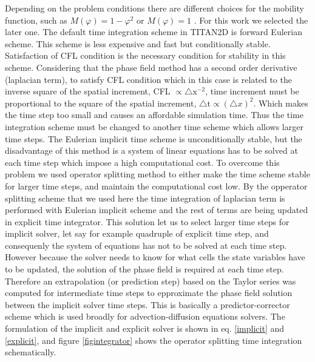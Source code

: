 \documentclass[letterpaper,10pt]{article}
\begin{document}
Depending on the problem conditions there are different choices for the mobility function, such 
as $M(\varphi)=1-\varphi^2$ or $M(\varphi)=1$ \cite{}. For this work we selected the later one.\newline
The default time integration scheme in TITAN2D is forward Eulerian scheme. This scheme is less expensive and fast but conditionally 
stable. Satisfaction of CFL condition is the necessary condition for stability in this scheme. Considering that the phase field 
method has a second order derivative (laplacian term), to satisfy CFL condition which in this case is related to the inverse
square of the spatial increment, CFL $\propto \bigtriangleup \text{x}^{-2}$, time increment must be proportional to the square 
of the spatial increment, $\bigtriangleup \text{t} \propto ( \bigtriangleup x)^2 $. Which makes the time step too small and causes 
an affordable simulation time.
Thus the time integration scheme must be changed to another time scheme which allows larger time steps.
The Eulerian implicit time scheme is unconditionally stable, but the disadvantage of this method is 
a system of linear equations has to be solved at each time step which impose a high computational cost.
To overcome this problem we used operator splitting method to either make the time scheme stable for larger time steps,  
and maintain the computational cost low.  
By the opperator splitting scheme that we used here the time integration of laplacian term is performed with Eulerian implicit 
scheme and the rest of terms are being updated in explicit time integrator. This solution let us to select larger time steps 
for implicit solver, let say for example quadruple of explicit time step, and consequenly the system of equations has not 
to be solved at each time step. However because the solver needs to know for what cells the state variables have to be 
updated, the solution of the phase field is required at each time step. Therefore an extrapolation (or prediction step)
based on the Taylor series was computed for intermediate time steps to epproximate the phase field solution between the implicit 
solver time steps.
This is basically a predictor-corrector scheme which is used broadly for advection-diffusion equations solvers. 
The formulation of the implicit and explicit solver is shown in eq.  \eqref{implicit} and \eqref{explicit}, and 
figure \ref{figintegrator} shows the operator splitting time integration schematically.
% 
\end{document}
